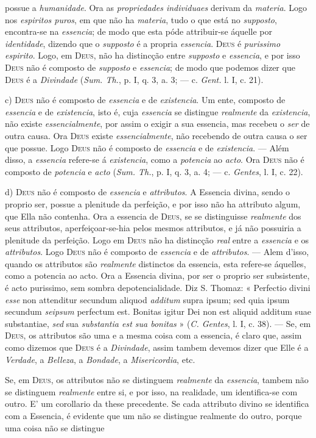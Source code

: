 possue a \emph{humanidade}. Ora as \emph{propriedades individuaes} derivam da \emph{materia}. Logo nos \emph{espiritos puros}, em que não ha \emph{materia}, tudo o que está no \emph{supposto}, encontra-se na \emph{essencia}; de modo que esta póde attribuir-se áquelle por \emph{identidade}, dizendo que o \emph{supposto} é a propria \emph{essencia}. \textsc{Deus} é \emph{purissimo espirito}. Logo, em \textsc{Deus}, não ha distincção entre \emph{supposto} e \emph{essencia}, e por isso \textsc{Deus} não é composto de \emph{supposto} e \emph{essencia}; de modo que podemos dizer que \textsc{Deus} é a \emph{Divindade} (\emph{Sum. Th.}, p. I, q. 3, a. 3; --- c. \emph{Gent.} l. I, c. 21).\par c) \textsc{Deus} não é composto de \emph{essencia} e de \emph{existencia}. Um ente, composto de \emph{essencia} e de \emph{existencia}, isto é, cuja \emph{essencia} se distingue \emph{realmente} da \emph{existencia}, não existe \emph{essencialmente}, por assim o exigir a sua essencia, mas recebeu o \emph{ser} de outra causa. Ora \textsc{Deus} existe \emph{essencialmente}, não recebendo de outra causa o ser que possue. Logo \textsc{Deus} não é composto de \emph{essencia} e de \emph{existencia}. --- Além disso, a \emph{essencia} refere-se á \emph{existencia}, como a \emph{potencia} ao \emph{acto}. Ora \textsc{Deus} não é composto de \emph{potencia} e \emph{acto} (\emph{Sum. Th.}, p. I, q. 3, a. 4; --- c. \emph{Gentes}, l. I, c. 22).\par d) \textsc{Deus} não é composto de \emph{essencia} e \emph{attributos}. A Essencia divina, sendo o proprio ser, possue a plenitude da perfeição, e por isso não ha attributo algum, que Ella não contenha. Ora a essencia de \textsc{Deus}, se se distinguisse \emph{realmente} dos seus attributos, aperfeiçoar-se-hia pelos mesmos attributos, e já não possuiria a plenitude da perfeição. Logo em \textsc{Deus} não ha distincção \emph{real} entre a \emph{essencia} e os \emph{attributos}. Logo \textsc{Deus} não é composto de \emph{essencia} e de \emph{attributos}. --- Alem d'isso, quando os attributos são \emph{realmente} distinctos da essencia, esta refere-se áquelles, como a potencia ao acto. Ora a Essencia divina, por ser o proprio ser subsistente, é acto purissimo, sem sombra depotencialidade. Diz S. Thomaz: « Perfectio divini \emph{esse} non attenditur secundum aliquod \emph{additum} supra ipsum; sed quia ipsum secundum \emph{seipsum} perfectum est. Bonitas igitur Dei non est aliquid additum suae substantiae, \emph{sed} sua \emph{substantia est sua bonitas} » (\emph{C. Gentes}, l. I, c. 38). --- Se, em \textsc{Deus}, os attributos são uma e a mesma coisa com a essencia, é claro que, assim como dizemos que \textsc{Deus} é a \emph{Divindade}, assim tambem devemos dizer que Elle é a \emph{Verdade}, a \emph{Belleza}, a \emph{Bondade}, a \emph{Misericordia}, etc.\par Se, em \textsc{Deus}, os attributos não se distinguem \emph{realmente} da \emph{essencia}, tambem não se distinguem \emph{realmente} entre si, e por isso, na realidade, um identifica-se com outro. E' um corollario da these precedente. Se cada attributo divino se identifica com a Essencia, é evidente que um não se distingue realmente do outro, porque uma coisa não se distingue 